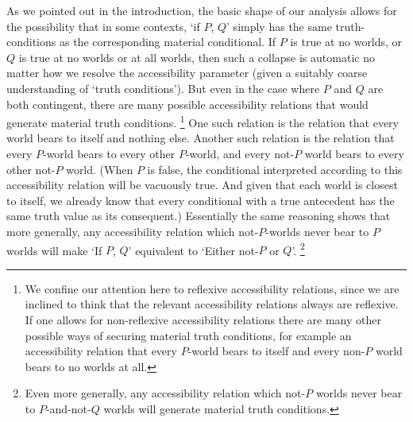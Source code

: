 \documentclass[If.tex]{subfiles}
\begin{document}
 
As we pointed out in the introduction, the basic shape of our analysis allows for the possibility that in some contexts, ‘if $P$, $Q$’ simply has the same truth-conditions as the corresponding material conditional.  If $P$ is true at no worlds, or $Q$ is true at no worlds or at all worlds, then such a collapse is automatic no matter how we resolve the accessibility parameter (given a suitably coarse understanding of ‘truth conditions’).  But even in the case where $P$ and $Q$ are both contingent, there are many possible accessibility relations that would generate material truth conditions.%
\footnote{We confine our attention here to reflexive accessibility relations, since we are inclined to think that the relevant accessibility relations always are reflexive.  If one allows for non-reflexive accessibility relations there are many other possible ways of securing material truth conditions, for example an accessibility relation that every $P$-world bears to itself and every non-$P$ world bears to no worlds at all.}  
One such relation is the relation that every world bears to itself and nothing else.  Another such relation is the relation that every $P$-world bears to every other $P$-world, and every not-$P$ world bears to every other not-$P$ world.  (When $P$ is false, the conditional interpreted according to this accessibility relation will be vacuously true.  And given that each world is closest to itself, we already know that every conditional with a true antecedent has the same truth value as its consequent.)  Essentially the same reasoning shows that more generally, any accessibility relation which not-$P$-worlds never bear to $P$ worlds will make ‘If $P$, $Q$’ equivalent to ‘Either not-$P$ or $Q$’.%
\footnote{Even more generally, any accessibility relation which not-$P$ worlds never bear to $P$-and-not-$Q$ worlds will generate material truth conditions.  }  
\end{document}
